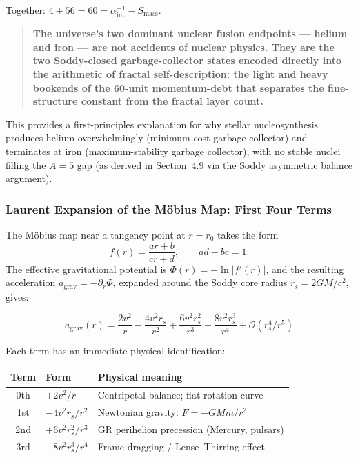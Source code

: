     Together: $4 + 56 = 60 = \alpha^{-1}_{\text{int}} - S_{\text{mass}}$.

    \begin{quote}
    \textbf{The universe's two dominant nuclear fusion endpoints --- helium and
    iron --- are not accidents of nuclear physics. They are the two Soddy-closed
    garbage-collector states encoded directly into the arithmetic of fractal
    self-description: the light and heavy bookends of the 60-unit momentum-debt
    that separates the fine-structure constant from the fractal layer count.}
    \end{quote}

    This provides a first-principles explanation for why stellar nucleosynthesis
    produces helium overwhelmingly (minimum-cost garbage collector) and terminates
    at iron (maximum-stability garbage collector), with no stable nuclei filling
    the $A = 5$ gap (as derived in Section~4.9 via the Soddy asymmetric balance
    argument).



\subsubsection{Laurent Expansion of the Möbius Map: First Four Terms}

  The Möbius map near a tangency point at $r = r_0$ takes the form
  \[
    f(r) = \frac{ar + b}{cr + d}, \qquad ad - bc = 1.
  \]
  The effective gravitational potential is $\Phi(r) = -\ln|f'(r)|$, and the
  resulting acceleration $a_{\text{grav}} = -\partial_r \Phi$, expanded around the
  Soddy core radius $r_s = 2GM/c^2$, gives:

  \begin{equation}
    a_{\text{grav}}(r) = \frac{2v^2}{r}
      - \frac{4v^2 r_s}{r^2}
      + \frac{6v^2 r_s^2}{r^3}
      - \frac{8v^2 r_s^3}{r^4}
      + \mathcal{O}(r_s^4/r^5)
    \label{eq:laurent}
  \end{equation}

  Each term has an immediate physical identification:

  \begin{table}[h]
  \centering
  \begin{tabular}{|c|l|l|}
  \hline
  \textbf{Term} & \textbf{Form} & \textbf{Physical meaning} \\
  \hline
  0th & $+2v^2/r$ & Centripetal balance; flat rotation curve \\
  1st & $-4v^2 r_s/r^2$ & Newtonian gravity: $F = -GM m/r^2$ \\
  2nd & $+6v^2 r_s^2/r^3$ & GR perihelion precession (Mercury, pulsars) \\
  3rd & $-8v^2 r_s^3/r^4$ & Frame-dragging / Lense--Thirring effect \\
  \hline
  \end{tabular}
  \end{table}

